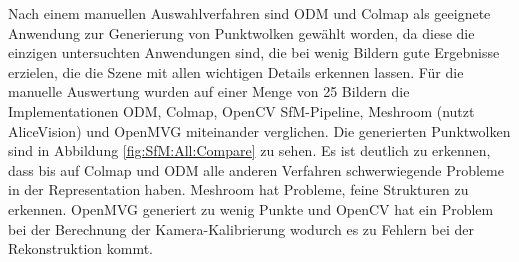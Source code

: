 \documentclass[12pt,titlepage, twoside]{article}
\begin{document}
Nach einem manuellen Auswahlverfahren sind ODM und Colmap als geeignete Anwendung zur Generierung von Punktwolken gewählt worden, 
da diese die einzigen untersuchten Anwendungen sind, die bei wenig Bildern gute Ergebnisse erzielen, die die Szene mit allen wichtigen Details erkennen lassen.
Für die manuelle Auswertung wurden auf einer Menge von 25 Bildern die Implementationen ODM, Colmap, OpenCV SfM-Pipeline, Meshroom (nutzt AliceVision) und OpenMVG miteinander verglichen. 
Die generierten Punktwolken sind in Abbildung \ref{fig:SfM:All:Compare} zu sehen.
Es ist deutlich zu erkennen, dass bis auf Colmap und ODM alle anderen Verfahren schwerwiegende Probleme in der Representation haben. Meshroom hat Probleme, feine Strukturen zu erkennen. 
OpenMVG generiert zu wenig Punkte und OpenCV hat ein Problem bei der Berechnung der Kamera-Kalibrierung wodurch es zu Fehlern bei der Rekonstruktion kommt.
\end{document}
